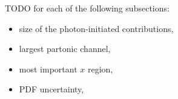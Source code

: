 \noindent
TODO for each of the following subsections:
\begin{itemize}
\item size of the photon-initiated contributions,
\item largest partonic channel,
\item most important $x$ region,
\item PDF uncertainty,
\end{itemize}




%
%
%
